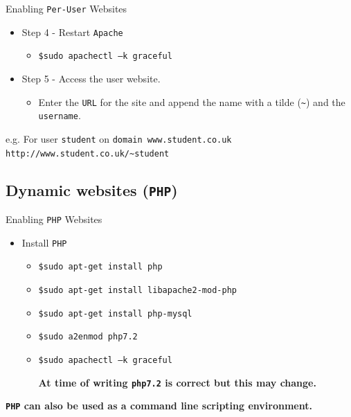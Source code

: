 \documentclass[xcolor=table]{beamer}
\begin{document}
\begin{frame}{Enabling \texttt{Per-User} Websites}
  \begin{itemize}
     \item Step 4 - Restart \texttt{Apache}
       \begin{itemize}
         \item \texttt{\$sudo apachectl –k graceful}
       \end{itemize}
     \item  Step 5 - Access the user website.
       \begin{itemize}
         \item Enter the \texttt{URL} for the site and append the name with a tilde (\texttt{\textasciitilde}) and the \texttt{username}. 
       \end{itemize}
   \end{itemize}
   \begin{tcolorbox}
    \begin{center}
      \scriptsize e.g. For user \texttt{student} on \texttt{domain www.student.co.uk}\\\texttt{http://www.student.co.uk/\textasciitilde student}
    \end{center}
  \end{tcolorbox}
\end{frame}

\subsection{Dynamic websites (\texttt{PHP})}
\begin{frame}{Enabling \texttt{PHP} Websites}
   \begin{itemize}
      \item Install \texttt{PHP}
        \begin{itemize}
          \item \texttt{\$sudo apt-get install php}
          \item \texttt{\$sudo apt-get install libapache2-mod-php}
          \item \texttt{\$sudo apt-get install php-mysql}
          \item \texttt{\$sudo a2enmod php7.2}
          \item \texttt{\$sudo apachectl –k graceful}
            \begin{tcolorbox}
              \begin{center}
                 \scriptsize \textbf{At time of writing \texttt{php7.2} is correct but this may change.}
              \end{center}
            \end{tcolorbox}
        \end{itemize}
    \end{itemize}
    \begin{tcolorbox}
      \begin{center}
        \scriptsize \textbf{\texttt{PHP} can also be used as a command line scripting environment.}
      \end{center}
    \end{tcolorbox}
\end{frame}
\end{document}
